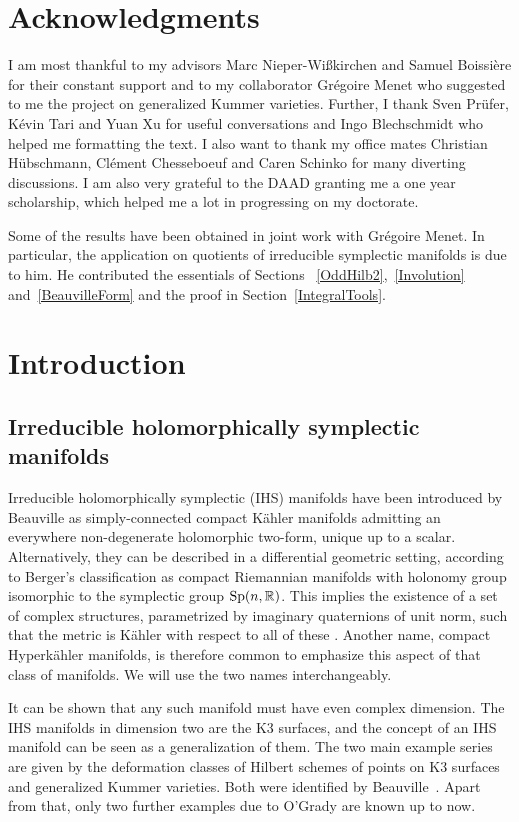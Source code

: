 \section*{Acknowledgments}
I am most thankful to my advisors Marc Nieper-Wi\ss\-kir\-chen and Samuel Boissi\`ere for their constant support
and to my collaborator Gr\'egoire Menet who suggested to me the project on generalized Kummer varieties.
Further, I thank Sven Pr\"ufer, K\'evin Tari and Yuan Xu for useful conversations and
Ingo Blechschmidt who helped me formatting the text.
I also want to thank my office mates Christian H\"ubschmann, Cl\'ement Chesseboeuf and Caren Schinko for many diverting discussions.
I am also very grateful to the DAAD granting me a one year scholarship, which helped me a lot in progressing on my doctorate. 

Some of the results have been obtained in joint work with Gr\'egoire Menet. In particular, the application on quotients of irreducible symplectic manifolds is due to him.
He contributed the essentials of Sections~ \ref{OddHilb2},~\ref{Involution} and~\ref{BeauvilleForm} and the proof in Section~\ref{IntegralTools}.

\section{Introduction}
\subsection{Irreducible holomorphically symplectic manifolds}
Irreducible holomorphically symplectic (IHS) manifolds have been introduced by Beauville \cite{Beauville} as simply-connected compact K\"ahler manifolds admitting an everywhere non-degenerate holomorphic two-form, unique up to a scalar. 
Alternatively, they can be described in a differential geometric setting, according to Berger's classification as compact Riemannian manifolds with holonomy group isomorphic to the symplectic group $\operatorname{Sp}(n,\mathbb{R})$. This implies the existence of a set of complex structures, parametrized by imaginary quaternions of unit norm, such that the metric is K\"ahler with respect to all of these \cite[Sect.~23]{Huybrechts}. 
Another name, compact Hyperk\"ahler manifolds, is therefore common to emphasize this aspect of that class of manifolds. We will use the two names interchangeably.

It can be shown that any such manifold must have even complex dimension. The IHS manifolds in dimension two are the K3 surfaces, and the concept of an IHS manifold can be seen as a generalization of them. The two main example series are given by the deformation classes of Hilbert schemes of points on K3 surfaces and generalized Kummer varieties. Both were identified by Beauville~\cite{Beauville}. Apart from that, only two further examples due to O'Grady are known up to now.

